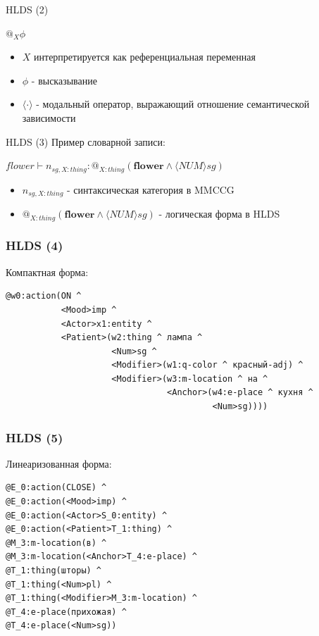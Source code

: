 \documentclass{beamer}
\begin{document}
\begin{frame}{HLDS (2)}
\begin{center}
$@_X\phi$
\end{center}
\bigskip
\begin{itemize}
	\item $X$ интерпретируется как референциальная переменная
	\item $\phi$ - высказывание
	\item $\langle \cdot \rangle$ - модальный оператор, выражающий отношение семантической зависимости
\end{itemize}	
\end{frame}

\begin{frame}{HLDS (3)}
Пример словарной записи:\\
\bigskip
\begin{center}
$flower \vdash n_{sg,X:thing} : @_{X:thing}(\textbf{flower} \wedge \langle NUM \rangle sg)$
\end{center}
\bigskip
\begin{itemize}
	\item $n_{sg,X:thing}$ - синтаксическая категория в MMCCG
	\item $@_{X:thing}(\textbf{flower} \wedge \langle NUM \rangle sg)$ - логическая форма в HLDS
\end{itemize}	
\end{frame}


\begin{frame}[fragile]
\frametitle{HLDS (4)}
Компактная форма:
{\footnotesize \begin{verbatim}
@w0:action(ON ^
           <Mood>imp ^
           <Actor>x1:entity ^
           <Patient>(w2:thing ^ лампа ^
                     <Num>sg ^
                     <Modifier>(w1:q-color ^ красный-adj) ^
                     <Modifier>(w3:m-location ^ на ^
                                <Anchor>(w4:e-place ^ кухня ^
                                         <Num>sg))))
\end{verbatim}}
\end{frame}

\begin{frame}[fragile]
\frametitle{HLDS (5)}
Линеаризованная форма:
{\footnotesize \begin{verbatim}
@E_0:action(CLOSE) ^ 
@E_0:action(<Mood>imp) ^
@E_0:action(<Actor>S_0:entity) ^ 
@E_0:action(<Patient>T_1:thing) ^ 
@M_3:m-location(в) ^ 
@M_3:m-location(<Anchor>T_4:e-place) ^ 
@T_1:thing(шторы) ^ 
@T_1:thing(<Num>pl) ^ 
@T_1:thing(<Modifier>M_3:m-location) ^ 
@T_4:e-place(прихожая) ^ 
@T_4:e-place(<Num>sg))
\end{verbatim}}
\end{frame}
\end{document}
